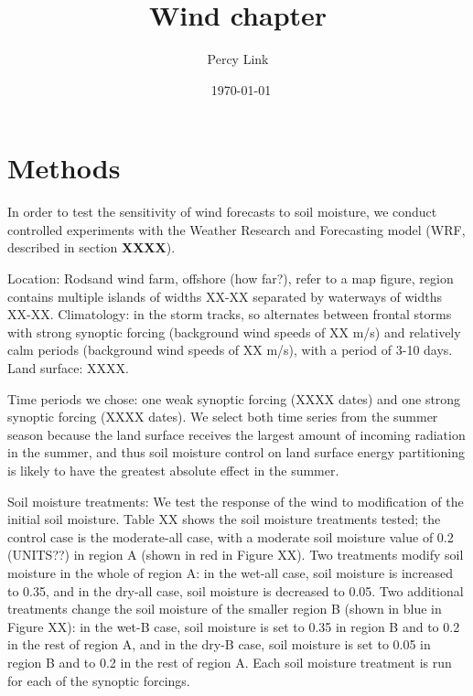 \documentclass[12pt]{amsart}
\title{Wind chapter}
\author{Percy Link}
\date{\currenttime \ \today} %
\begin{document}
\maketitle

\section{Methods}
In order to test the sensitivity of wind forecasts to soil moisture, we conduct controlled experiments with the Weather Research and Forecasting model (WRF, described in section \textbf{XXXX}).

Location: Rodsand wind farm, offshore (how far?), refer to a map figure, region contains multiple islands of widths XX-XX separated by waterways of widths XX-XX.  Climatology: in the storm tracks, so alternates between frontal storms with strong synoptic forcing (background wind speeds of XX m/s) and relatively calm periods (background wind speeds of XX m/s), with a period of 3-10 days.  Land surface: XXXX.

Time periods we chose: one weak synoptic forcing (XXXX dates) and one strong synoptic forcing (XXXX dates).  We select both time series from the summer season because the land surface receives the largest amount of incoming radiation in the summer, and thus soil moisture control on land surface energy partitioning is likely to have the greatest absolute effect in the summer.

Soil moisture treatments: We test the response of the wind to modification of the initial soil moisture.  Table XX shows the soil moisture treatments tested; the control case is the moderate-all case, with a moderate soil moisture value of 0.2 (UNITS??) in region A (shown in red in Figure XX).  Two treatments modify soil moisture in the whole of region A: in the wet-all case, soil moisture is increased to 0.35, and in the dry-all case, soil moisture is decreased to 0.05.  Two additional treatments change the soil moisture of the smaller region B (shown in blue in Figure XX): in the wet-B case, soil moisture is set to 0.35 in region B and to 0.2 in the rest of region A, and in the dry-B case, soil moisture is set to 0.05 in region B and to 0.2 in the rest of region A.  Each soil moisture treatment is run for each of the synoptic forcings.
\end{document}
